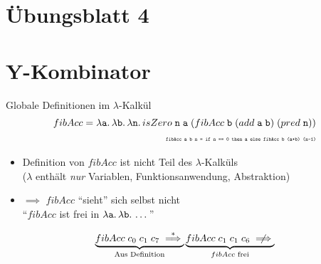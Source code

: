 \documentclass{beamer}
\begin{document}
\section{Übungsblatt 4}

\section{Y-Kombinator}

\begin{frame}{Globale Definitionen im $\lambda$-Kalkül}
	\begin{align*}
		fibAcc = \lambda \texttt{a}.\, \lambda \texttt{b}.\, \lambda \texttt{n}.\, isZero\;\texttt{n}\;\texttt{a}\;(fibAcc\;\texttt{b}\;(add\;\texttt{a}\;\texttt{b})\;(pred\;\texttt{n})) \\
		\tiny\texttt{fibAcc a b n = if n == 0 then a else fibAcc b (a+b) (n-1)}
	\end{align*}

	\begin{itemize}
		\item Definition von $fibAcc$ ist nicht Teil des $\lambda$-Kalküls \\
		      ($\lambda$ enthält \emph{nur} Variablen, Funktionsanwendung, Abstraktion)
		\item $\implies$ $fibAcc$ \enquote{sieht} sich selbst nicht \\
			  \enquote{$fibAcc$ ist frei in $\lambda \texttt{a}.\, \lambda \texttt{b}.\, \dots$}
	\end{itemize}

	\begin{equation*}
		\underbrace{\apppp{fibAcc}{c_0}{c_1}{c_7} \stackrel{\ast}{\implies}}_{\text{Aus Definition}} \underbrace{\apppp{fibAcc}{c_1}{c_1}{c_6} \centernot\implies}_{\text{$fibAcc$ frei}}
	\end{equation*}
\end{frame}
\end{document}
